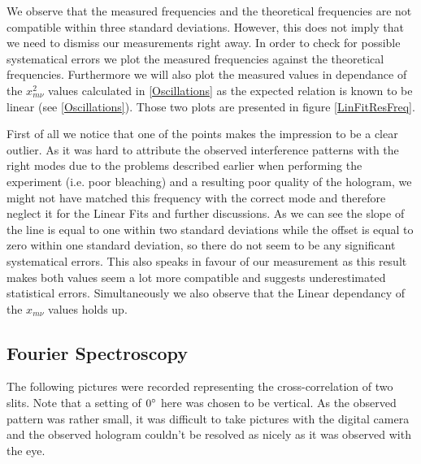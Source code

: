 We observe that the measured frequencies and the theoretical frequencies are not compatible within three standard deviations. However, this does not imply that we need to dismiss our measurements right away. In order to check for possible systematical errors we plot the measured frequencies against the theoretical frequencies. Furthermore we will also plot the measured values in dependance of the $x_{m\nu}^2$ values calculated in \ref{Oscillations} as the expected relation is known to be linear (see \ref{Oscillations}). Those two plots are presented in figure \ref{LinFitResFreq}.


First of all we notice that one of the points makes the impression to be a clear outlier. As it was hard to attribute the observed interference patterns with the right modes due to the problems described earlier when performing the experiment (i.e. poor bleaching) and a resulting poor quality of the hologram, we might not have matched this frequency with the correct mode and therefore neglect it for the Linear Fits and further discussions.
As we can see the slope of the line is equal to one within two standard deviations while the offset is equal to zero within one standard deviation, so there do not seem to be any significant systematical errors. This also speaks in favour of our measurement as this result makes both values seem a lot more compatible and suggests underestimated statistical errors. Simultaneously we also observe that the Linear dependancy of the $x_{m\nu}$ values holds up. 


\subsection{Fourier Spectroscopy}

The following pictures were recorded representing the cross-correlation of two slits. Note that a setting of $0^\circ$ here was chosen to be vertical. As the observed pattern was rather small, it was difficult to take pictures with the digital camera and the observed hologram couldn't be resolved as nicely as it was observed with the eye.


